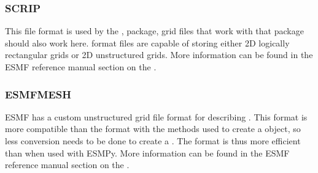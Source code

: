 \documentclass[letterpaper,10pt,english]{sphinxmanual}
\begin{document}
\subsubsection{SCRIP}
\label{\detokenize{api:scrip}}\label{\detokenize{api:id2}}
This file format is used by the {\hyperref[\detokenize{FileFormat:ESMF.api.constants.FileFormat.SCRIP}]{}} , package, grid files that
work with that package should also work here.  {\hyperref[\detokenize{FileFormat:ESMF.api.constants.FileFormat.SCRIP}]{}} format files are
capable of storing either 2D logically rectangular grids or 2D
unstructured grids.  More information can be found in the ESMF reference
manual section on the .


\subsubsection{ESMFMESH}
\label{\detokenize{api:esmfmesh}}\label{\detokenize{api:id4}}
ESMF has a custom unstructured grid file format for describing {\hyperref[\detokenize{mesh:ESMF.api.mesh.Mesh}]{}}.
This format is more compatible than the {\hyperref[\detokenize{FileFormat:ESMF.api.constants.FileFormat.SCRIP}]{}} format with the methods
used to create a {\hyperref[\detokenize{mesh:ESMF.api.mesh.Mesh}]{}} object, so less conversion needs to be done to
create a {\hyperref[\detokenize{mesh:ESMF.api.mesh.Mesh}]{}}. The {\hyperref[\detokenize{FileFormat:ESMF.api.constants.FileFormat.ESMFMESH}]{}} format is thus more efficient than {\hyperref[\detokenize{FileFormat:ESMF.api.constants.FileFormat.SCRIP}]{}} when
used with ESMPy.  More information can be found in the ESMF reference
manual section on the .
\end{document}

